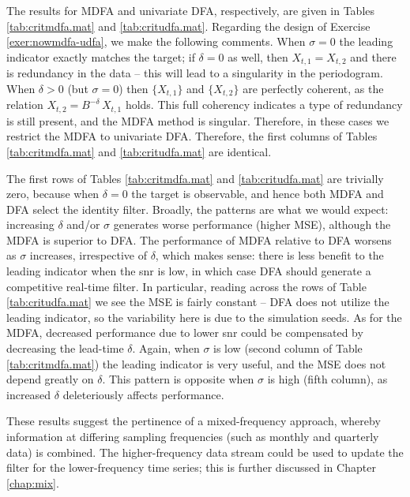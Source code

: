 \documentclass[a4paper]{book}
\begin{document}
 The results for MDFA and univariate DFA, respectively, are given in 
Tables \ref{tab:critmdfa.mat} and \ref{tab:critudfa.mat}.
Regarding the design of Exercise \ref{exer:nowmdfa-udfa}, we make the following 
comments.  When $\sigma = 0$ the leading indicator exactly matches the target;
 if $\delta = 0$ as well, then $X_{t,1} = X_{t,2}$ and there is redundancy in
 the data -- this will lead to a singularity in the periodogram.  When 
 $\delta > 0$ (but $\sigma = 0$) then $\{ X_{t,1} \}$ and $\{ X_{t,2} \}$
 are perfectly coherent, as the relation $X_{t,2} = B^{-\delta} \, X_{t,1}$ holds.
 This full coherency indicates a type of redundancy is still present,
 and the MDFA method is singular.  Therefore, in these cases we restrict
 the MDFA to univariate DFA.  Therefore, the first columns of 
 Tables \ref{tab:critmdfa.mat} and \ref{tab:critudfa.mat} are identical.

 The first rows of Tables \ref{tab:critmdfa.mat} and \ref{tab:critudfa.mat}
 are trivially zero, because when $\delta = 0$ the target is observable,
 and hence both MDFA and DFA select the identity filter.  
 Broadly, the patterns are what we would expect: increasing $\delta$ and/or
 $\sigma$ generates worse performance (higher MSE), although the MDFA is
 superior to DFA.  The performance of MDFA relative to DFA worsens as 
 $\sigma$ increases, irrespective of $\delta$, which makes sense: there
 is less benefit to the leading indicator when the snr is low, in which
 case DFA should generate a competitive real-time filter.
  In particular, reading across the rows of Table \ref{tab:critudfa.mat}
 we see the MSE is fairly constant -- DFA does not utilize the leading indicator,
 so the variability here is due to the simulation seeds.
  As for the MDFA, decreased performance due to lower snr could be 
 compensated by decreasing the lead-time $\delta$.  
  Again, when $\sigma$ is low (second column of Table \ref{tab:critmdfa.mat})
  the leading indicator is very useful, and the MSE does not depend 
 greatly on $\delta$.  This pattern is opposite when $\sigma$ is high 
 (fifth column), as increased $\delta$ deleteriously affects performance.

   
These results suggest the pertinence of a mixed-frequency approach,
 whereby information at differing sampling frequencies (such as monthly
 and quarterly data) is combined.  The higher-frequency data stream
 could be used to update the filter for the lower-frequency time series;
 this is further discussed in Chapter \ref{chap:mix}. 
 

\end{document}
